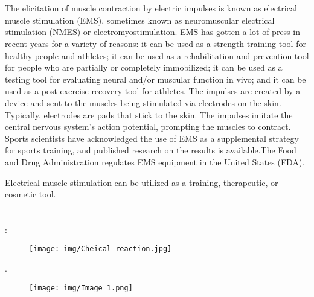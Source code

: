 \documentclass[11pt]{article}
\begin{document}
\newpage
\section{}
The elicitation of muscle contraction by electric impulses is known as electrical muscle stimulation (EMS), sometimes known as neuromuscular electrical stimulation (NMES) or electromyostimulation. EMS has gotten a lot of press in recent years for a variety of reasons: it can be used as a strength training tool for healthy people and athletes; it can be used as a rehabilitation and prevention tool for people who are partially or completely immobilized; it can be used as a testing tool for evaluating neural and/or muscular function in vivo; and it can be used as a post-exercise recovery tool for athletes. The impulses are created by a device and sent to the muscles being stimulated via electrodes on the skin.
                                Typically, electrodes are pads that stick to the skin. The impulses imitate the central nervous system's action potential, prompting the muscles to contract. Sports scientists have acknowledged the use of EMS as a supplemental strategy for sports training, and published research on the results is available.The Food and Drug Administration regulates EMS equipment in the United States (FDA). 

Electrical muscle stimulation can be utilized as a training, therapeutic, or cosmetic tool.


 

\section{}

:\newline
\begin{figure}[H]
    \centering
    \texttt{[image: img/Cheical reaction.jpg]}
    \label{fig:bad_images}
\end{figure}
.
\begin{figure}[H]
    \centering
    \texttt{[image: img/Image 1.png]}
    \caption{}
    \label{fig:bad_images}
\end{figure}

\section{}
\end{document}
